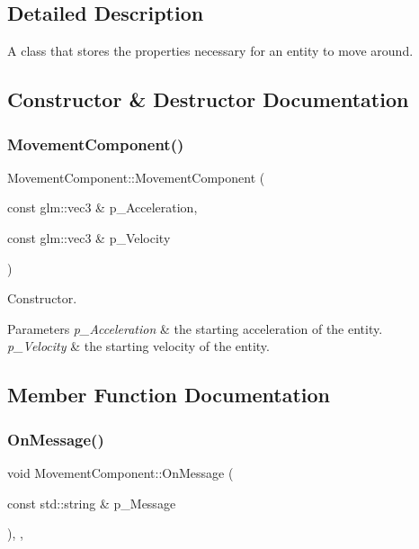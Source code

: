 \subsection{Detailed Description}
A class that stores the properties necessary for an entity to move around. 

\subsection{Constructor \& Destructor Documentation}
\mbox{\label{class_movement_component_a63eff0fd15a701acc43d36d14b2e0464}} 
\subsubsection{\texorpdfstring{MovementComponent()}{MovementComponent()}}
{\footnotesize\ttfamily Movement\+Component\+::\+Movement\+Component (\begin{DoxyParamCaption}\item[{const glm\+::vec3 \&}]{p\+\_\+\+Acceleration,  }\item[{const glm\+::vec3 \&}]{p\+\_\+\+Velocity }\end{DoxyParamCaption})\hspace{0.3cm}{\ttfamily [inline]}}



Constructor. 


\begin{DoxyParams}{Parameters}
{\em p\+\_\+\+Acceleration} & the starting acceleration of the entity. \\
\hline
{\em p\+\_\+\+Velocity} & the starting velocity of the entity. \\
\hline
\end{DoxyParams}


\subsection{Member Function Documentation}
\mbox{\label{class_movement_component_aa82c5ab1af1d6bf286f264ad760e1e30}} 
\subsubsection{\texorpdfstring{OnMessage()}{OnMessage()}}
{\footnotesize\ttfamily void Movement\+Component\+::\+On\+Message (\begin{DoxyParamCaption}\item[{const std\+::string \&}]{p\+\_\+\+Message }\end{DoxyParamCaption})\hspace{0.3cm}{\ttfamily [inline]}, {\ttfamily [override]}, {\ttfamily [virtual]}}



